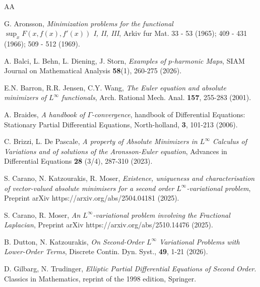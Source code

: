 \documentclass[a4paper,11pt]{article}
\numberwithin{equation}{section}
\theoremstyle{definition}
\begin{document}
\begin{thebibliography}{AA} 

G. Aronsson, {\it Minimization problems for the functional $\sup_xF(x, f(x), f'(x))$ I, II, III}, Arkiv
fur Mat. 33 - 53 (1965); 409 - 431 (1966); 509 - 512 (1969).

{A. Balci, L. Behn, L. Diening, J. Storn,} {\it {Examples of \({p}\)-harmonic Maps}}, {SIAM Journal on Mathematical Analysis} {\bf 58}(1), 260-275 (2026).

E.N. Barron, R.R. Jensen, C.Y. Wang, {\it The Euler equation and absolute minimizers of $L^\infty$ functionals}, Arch. Rational
Mech. Anal. {\bf 157}, 255-283 (2001).

A. Braides, {\it A handbook of $\Gamma$-convergence},
handbook of Differential Equations: Stationary Partial Differential Equations,
North-holland,
{\bf 3}, 101-213 (2006).

 C. Brizzi, L. De Pascale, \emph{A property of Absolute Minimizers in $ L^{\infty}$  Calculus of Variations and of solutions of the Aronsson-Euler equation}, Advances in Differential Equations {\bf 28} (3/4), 287-310 (2023).

S. Carano, N. Katzourakis, R. Moser, \emph{
Existence, uniqueness and characterisation of vector-valued absolute minimisers for a second order $L^\infty$-variational problem}, Preprint arXiv https://arxiv.org/abs/2504.04181 (2025).

S. Carano, R. Moser, \emph{
An $L^\infty$-variational problem involving the Fractional Laplacian}, Preprint arXiv https://arxiv.org/abs/2510.14476 (2025).




B. Dutton, N. Katzourakis, {\it On Second-Order $L^\infty$ Variational Problems with Lower-Order Terms}, Discrete Contin. Dyn. Syst., {\bf 49}, 1-21 (2026).

D. Gilbarg, N. Trudinger, {\it Elliptic Partial Differential Equations of Second Order}.
Classics in Mathematics, reprint of the 1998 edition, Springer.


\end{thebibliography}
\end{document}
